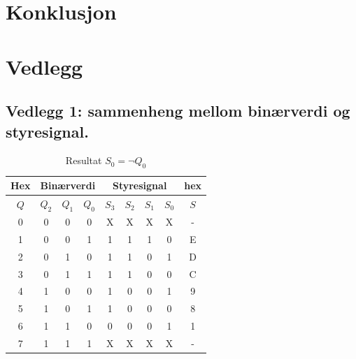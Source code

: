 \documentclass[12pt,norsk,a4paper]{article}
\begin{document}
\section{Konklusjon}
\clearpage

\section{Vedlegg}
    \subsection{Vedlegg 1: sammenheng mellom binærverdi og styresignal.}
    \begin{table}[H]
    \begin{center}
    \begin{tabular}{|c|c|c|c|c|c|c|c|c|}
    \hline
    Hex & \multicolumn{3}{c}{Binærverdi} & \multicolumn{4}{|c|}{Styresignal}&hex \\ \hline
    $Q$ & $Q_2$ & $Q_1$ & $Q_0$ & $S_3$ & $S_2$ & $S_1$ & $S_0$ & $S$ \\ \hline
    0 & 0 & 0 & 0 & X & X & X & X & - \\ \hline 
    1 & 0 & 0 & 1 & 1 & 1 & 1 & 0 & E \\ \hline
    2 & 0 & 1 & 0 & 1 & 1 & 0 & 1 & D \\ \hline
    3 & 0 & 1 & 1 & 1 & 1 & 0 & 0 & C \\ \hline
    4 & 1 & 0 & 0 & 1 & 0 & 0 & 1 & 9 \\ \hline
    5 & 1 & 0 & 1 & 1 & 0 & 0 & 0 & 8 \\ \hline
    6 & 1 & 1 & 0 & 0 & 0 & 0 & 1 & 1 \\ \hline
    7 & 1 & 1 & 1 & X & X & X & X & - \\ \hline
    \end{tabular}
    \end{center}
    \caption{Resultat $S_0=\neg Q_0$}
    \end{table}
    \clearpage
\end{document}
